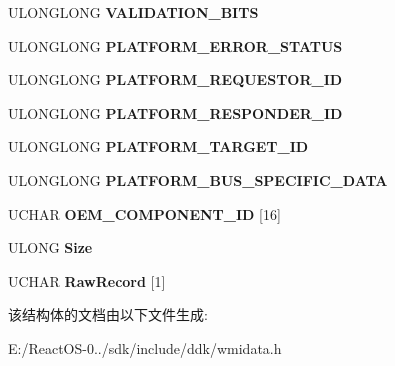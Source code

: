 \begin{DoxyCompactItemize}
U\+L\+O\+N\+G\+L\+O\+NG {\bfseries V\+A\+L\+I\+D\+A\+T\+I\+O\+N\+\_\+\+B\+I\+TS}
\item 
\mbox{\label{struct___m_s_m_c_a_event___platform_specific_error_af9552bbf9733514793e1d27b4a65afd0}} 
U\+L\+O\+N\+G\+L\+O\+NG {\bfseries P\+L\+A\+T\+F\+O\+R\+M\+\_\+\+E\+R\+R\+O\+R\+\_\+\+S\+T\+A\+T\+US}
\item 
\mbox{\label{struct___m_s_m_c_a_event___platform_specific_error_a22a2ad497373dedfb6ddda39b0db4b54}} 
U\+L\+O\+N\+G\+L\+O\+NG {\bfseries P\+L\+A\+T\+F\+O\+R\+M\+\_\+\+R\+E\+Q\+U\+E\+S\+T\+O\+R\+\_\+\+ID}
\item 
\mbox{\label{struct___m_s_m_c_a_event___platform_specific_error_a5d5a617b1f7677d831cb2ffd323b4f81}} 
U\+L\+O\+N\+G\+L\+O\+NG {\bfseries P\+L\+A\+T\+F\+O\+R\+M\+\_\+\+R\+E\+S\+P\+O\+N\+D\+E\+R\+\_\+\+ID}
\item 
\mbox{\label{struct___m_s_m_c_a_event___platform_specific_error_a4470f6c0a02b40f163769e2fa269da2a}} 
U\+L\+O\+N\+G\+L\+O\+NG {\bfseries P\+L\+A\+T\+F\+O\+R\+M\+\_\+\+T\+A\+R\+G\+E\+T\+\_\+\+ID}
\item 
\mbox{\label{struct___m_s_m_c_a_event___platform_specific_error_a6fbc079412a9a77f97dd0053260e99ff}} 
U\+L\+O\+N\+G\+L\+O\+NG {\bfseries P\+L\+A\+T\+F\+O\+R\+M\+\_\+\+B\+U\+S\+\_\+\+S\+P\+E\+C\+I\+F\+I\+C\+\_\+\+D\+A\+TA}
\item 
\mbox{\label{struct___m_s_m_c_a_event___platform_specific_error_a5bbb2ada82144427ec37ab54c678011d}} 
U\+C\+H\+AR {\bfseries O\+E\+M\+\_\+\+C\+O\+M\+P\+O\+N\+E\+N\+T\+\_\+\+ID} \mbox{[}16\mbox{]}
\item 
\mbox{\label{struct___m_s_m_c_a_event___platform_specific_error_a9dfee963a50857fa166407a23be1f6e0}} 
U\+L\+O\+NG {\bfseries Size}
\item 
\mbox{\label{struct___m_s_m_c_a_event___platform_specific_error_acab79029c01b80755e6f9491e6a357e0}} 
U\+C\+H\+AR {\bfseries Raw\+Record} \mbox{[}1\mbox{]}
\end{DoxyCompactItemize}


该结构体的文档由以下文件生成\+:\begin{DoxyCompactItemize}
\item 
E\+:/\+React\+O\+S-\/0../sdk/include/ddk/wmidata.\+h\end{DoxyCompactItemize}
